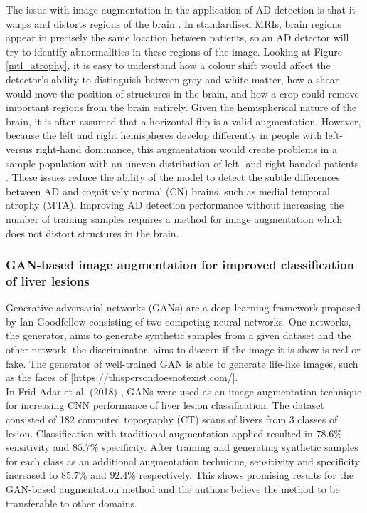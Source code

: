 \documentclass[
    author={Kai Hulme},
    supervisor={Dr Jon Bird},
    degree={BSc},
    title={Generative Adversarial Networks as an Augmentation Technique},
    subtitle={for Alzheimer's Disease Detection in MRI Volumes},
    type={Research},
    year={2021} 
]{dissertation}
\begin{document}
The issue with image augmentation in the application of AD detection is that it warps and distorts regions of the brain \cite{shorten2019survey}. In standardised MRIs, brain regions appear in precisely the same location between patients, so an AD detector will try to identify abnormalities in these regions of the image. Looking at Figure \ref{mtl_atrophy}, it is easy to understand how a colour shift would affect the detector's ability to distinguish between grey and white matter, how a shear would move the position of structures in the brain, and how a crop could remove important regions from the brain entirely. Given the hemispherical nature of the brain, it is often assumed that a horizontal-flip is a valid augmentation. However, because the left and right hemispheres develop differently in  people with left- versus right-hand dominance, this augmentation would create problems in a sample population with an uneven distribution of left- and right-handed patients \cite{rajeshwari2013efficient}. These issues reduce the ability of the model to detect the subtle differences between AD and cognitively normal (CN) brains, such as medial temporal atrophy (MTA). Improving AD detection performance without increasing the number of training samples requires a method for image augmentation which does not distort structures in the brain.

\subsubsection{GAN-based image augmentation for improved classification of liver lesions}

Generative adversarial networks (GANs) are a deep learning framework proposed by Ian Goodfellow \cite{goodfellow2014generative} consisting of two competing neural networks. One networks, the generator, aims to generate synthetic samples from a given dataset and the other network, the discriminator, aims to discern if the image it is show is real or fake. The generator of well-trained GAN is able to generate life-like images, such as the faces of [https://thispersondoesnotexist.com/]. 
\\

In Frid-Adar et al. (2018) \cite{frid2018gan}, GANs were used as an image augmentation technique for increasing CNN performance of liver lesion classification. The dataset consisted of 182 computed topography (CT) scans of livers from 3 classes of lesion. Classification with traditional augmentation applied resulted in $78.6\%$ sensitivity and $85.7\%$ specificity. After training and generating synthetic samples for each class as an additional augmentation technique, sensitivity and specificity increased to $85.7\%$ and $92.4\%$ respectively. This shows promising results for the GAN-based augmentation method and the authors believe the method to be transferable to other domains.
\end{document}
